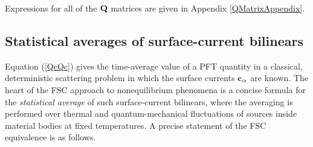 \documentclass[letterpaper]{article}
\begin{document}
Expressions for all of the $\mathbf{Q}$ matrices are given
in Appendix \ref{QMatrixAppendix}.

\subsection{Statistical averages of surface-current bilinears}

Equation (\ref{QcQc}) gives the time-average value of
a PFT quantity in a classical, deterministic scattering 
problem in which the surface currents $\mathbf{c}_\alpha$ are known.
The heart of the FSC approach to nonequilibrium phenomena 
is a concise formula for the \textit{statistical average} 
of such surface-current bilinears,
where the averaging is performed over thermal and quantum-mechanical
fluctuations of sources inside material bodies at fixed temperatures.
A precise statement of the FSC equivalence is as follows.
\end{document}
